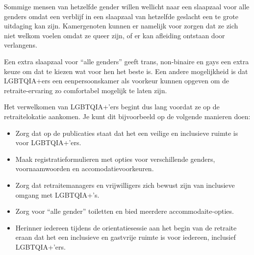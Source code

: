\documentclass[12pt,openany]{book}
\begin{document}
Sommige mensen van hetzelfde gender willen wellicht naar een slaapzaal voor alle genders omdat een verblijf in een slaapzaal van hetzelfde geslacht een te grote uitdaging kan zijn. Kamergenoten kunnen er namelijk voor zorgen dat ze zich niet welkom voelen omdat ze queer zijn, of er kan afleiding ontstaan door verlangens.

Een extra slaapzaal voor “alle genders” geeft trans, non-binaire en gays een extra keuze om dat te kiezen wat voor hen het beste is. Een andere mogelijkheid is dat LGBTQIA+ers een eenpersoonskamer als voorkeur kunnen opgeven om de retraite-ervaring zo comfortabel mogelijk te laten zijn. 

Het verwelkomen van LGBTQIA+’ers begint dus lang voordat ze op de retraitelokatie aankomen. Je kunt dit bijvoorbeeld op de volgende manieren doen:

\begin{itemize}
  \setlength\itemsep{0em}
  \item Zorg dat op de publicaties staat dat het een veilige en inclusieve ruimte is voor LGBTQIA+’ers.
  \item Maak registratieformulieren met opties voor verschillende genders, voornaamwoorden en accomodatievoorkeuren.
  \item Zorg dat retraitemanagers en vrijwilligers zich bewust zijn van inclusieve omgang met LGBTQIA+’s.
  \item Zorg voor “alle gender” toiletten en bied meerdere accommodaite-opties.
  \item Herinner iedereen tijdens de orientatiesessie aan het begin van de retraite eraan dat het een inclusieve en gastvrije ruimte is voor iedereen, inclusief LGBTQIA+’ers.
\end{itemize}

\begin{figure}[h]
    \centering
\end{figure}
\end{document}
